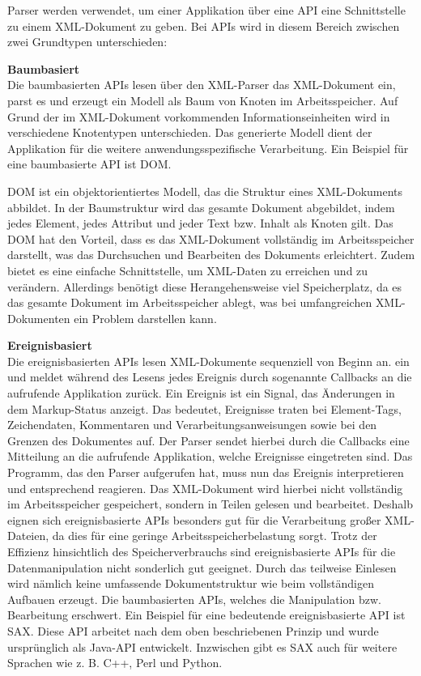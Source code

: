 Parser werden verwendet, um einer Applikation über eine \ac{API} eine Schnittstelle zu einem \ac{XML}-Dokument zu geben.
Bei \ac{API}s wird in diesem Bereich zwischen zwei Grundtypen unterschieden: \cite*[405]{Becher2022}

\textbf{Baumbasiert}\\
Die baumbasierten \ac{API}s lesen über den \ac{XML}-Parser das \ac{XML}-Dokument ein,
parst es und erzeugt ein Modell als Baum von Knoten im Arbeitsspeicher.
Auf Grund der im \ac{XML}-Dokument vorkommenden Informationseinheiten wird in verschiedene Knotentypen unterschieden.
Das generierte Modell dient der Applikation für die weitere anwendungsspezifische Verarbeitung.
Ein Beispiel für eine baumbasierte \ac{API} ist \ac{DOM}.

\ac{DOM} ist ein objektorientiertes Modell, das die Struktur eines \ac{XML}-Dokuments abbildet.
In der Baumstruktur wird das gesamte Dokument abgebildet, indem jedes Element, jedes Attribut und jeder Text bzw. Inhalt als Knoten gilt.
Das \ac{DOM} hat den Vorteil, dass es das \ac{XML}-Dokument vollständig im Arbeitsspeicher darstellt, was das Durchsuchen und Bearbeiten des Dokuments erleichtert.
Zudem bietet es eine einfache Schnittstelle, um XML-Daten zu erreichen und zu verändern.
Allerdings benötigt diese Herangehensweise viel Speicherplatz,
da es das gesamte Dokument im Arbeitsspeicher ablegt, was bei umfangreichen \ac{XML}-Dokumenten ein Problem darstellen kann. \cite*[413,414]{Becher2022}


\textbf{Ereignisbasiert}\\
Die ereignisbasierten \ac{API}s lesen \ac{XML}-Dokumente sequenziell von Beginn an.
ein und meldet während des Lesens jedes Ereignis durch sogenannte Callbacks an die aufrufende Applikation zurück.
Ein Ereignis ist ein Signal, das Änderungen in dem Markup-Status anzeigt.
Das bedeutet, Ereignisse traten bei Element-Tags, Zeichendaten, Kommentaren und Verarbeitungsanweisungen sowie bei den Grenzen des Dokumentes auf.
Der Parser sendet hierbei durch die Callbacks eine Mitteilung an die aufrufende Applikation, welche Ereignisse eingetreten sind.
Das Programm, das den Parser aufgerufen hat, muss nun das Ereignis interpretieren und entsprechend reagieren.
Das \ac{XML}-Dokument wird hierbei nicht vollständig im Arbeitsspeicher gespeichert, sondern in Teilen gelesen und bearbeitet.
Deshalb eignen sich ereignisbasierte \ac{API}s besonders gut für die Verarbeitung großer \ac{XML}-Dateien, da dies für eine geringe Arbeitsspeicherbelastung sorgt.
Trotz der Effizienz hinsichtlich des Speicherverbrauchs sind ereignisbasierte \ac{API}s für die Datenmanipulation nicht sonderlich gut geeignet.
Durch das teilweise Einlesen wird nämlich keine umfassende Dokumentstruktur wie beim vollständigen Aufbauen erzeugt. Die baumbasierten \ac{API}s,
welches die Manipulation bzw. Bearbeitung erschwert.
Ein Beispiel für eine bedeutende ereignisbasierte \ac{API} ist \ac{SAX}.
Diese \ac{API} arbeitet nach dem oben beschriebenen Prinzip und wurde ursprünglich als Java-\ac{API} entwickelt. Inzwischen gibt es \ac{SAX} auch für weitere Sprachen wie
z. B. C++, Perl und Python. \cite*[405]{Becher2022}


